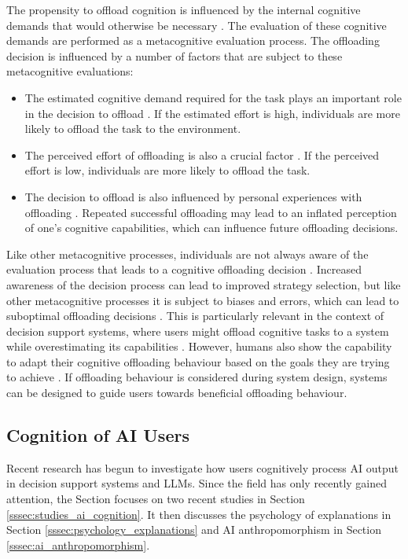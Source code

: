 The propensity to offload cognition is influenced by the internal cognitive demands that would otherwise be necessary \parencite{Gilbert2015, Risko2015}. The evaluation of these cognitive demands are performed as a metacognitive evaluation process. The offloading decision is influenced by a number of factors that are subject to these metacognitive evaluations:

\begin{itemize}
    \item The estimated cognitive demand required for the task plays an important role in the decision to offload \parencite{Risko2015}. If the estimated effort is high, individuals are more likely to offload the task to the environment.
    \item The perceived effort of offloading is also a crucial factor \parencite{Risko2015}. If the perceived effort is low, individuals are more likely to offload the task.
    \item The decision to offload is also influenced by personal experiences with offloading \parencite{Ward2013}. Repeated successful offloading may lead to an inflated perception of one's cognitive capabilities, which can influence future offloading decisions.
\end{itemize}

Like other metacognitive processes, individuals are not always aware of the evaluation process that leads to a cognitive offloading decision \parencite{Schunn2001}. Increased awareness of the decision process can lead to improved strategy selection, but like other metacognitive processes it is subject to biases and errors, which can lead to suboptimal offloading decisions \parencite{Risko2015}. This is particularly relevant in the context of decision support systems, where users might offload cognitive tasks to a system while overestimating its capabilities \parencite{Jussupow2021}. However, humans also show the capability to adapt their cognitive offloading behaviour based on the goals they are trying to achieve \parencite{Weis2019}. If offloading behaviour is considered during system design, systems can be designed to guide users towards beneficial offloading behaviour.

\subsection{Cognition of AI Users} \label{ssec:cognition_ai_users}

Recent research has begun to investigate how users cognitively process \ac{AI} output in decision support systems and \acp{LLM}. Since the field has only recently gained attention, the Section focuses on two recent studies in Section \ref{sssec:studies_ai_cognition}. It then discusses the psychology of explanations in Section \ref{sssec:psychology_explanations} and AI anthropomorphism in Section \ref{sssec:ai_anthropomorphism}.

